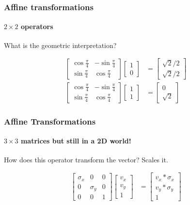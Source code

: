 \documentclass[xcolor=dvipsnames]{beamer}
\begin{document}
\begin{frame}
\frametitle{Affine transformations}
\framesubtitle{$2 \times 2$ operators}

  What is the geometric interpretation?

  \begin{align*}
    \left[ \begin{array}{rr}
      \cos \frac{\pi}{4} & -\sin \frac{\pi}{4} \\
      \sin \frac{\pi}{4} &  \cos \frac{\pi}{4}
      \end{array} \right]
    \left[ \begin{array}{r}
      1 \\
      0
      \end{array} \right]
    & = 
    \left[ \begin{array}{r}
      \sqrt{2}/2 \\
      \sqrt{2}/2
      \end{array} \right] \\
    \left[ \begin{array}{rr}
      \cos \frac{\pi}{4} & -\sin \frac{\pi}{4} \\
      \sin \frac{\pi}{4} &  \cos \frac{\pi}{4}
      \end{array} \right]
    \left[ \begin{array}{r}
      1 \\
      1
      \end{array} \right]
    & = 
    \left[ \begin{array}{r}
      0 \\
      \sqrt{2}  
      \end{array} \right]
    \end{align*}

  \end{frame}

\begin{frame}
\frametitle{Affine Transformations}
\framesubtitle{$3 \times 3$ matrices but still in a 2D world!}

  How does this operator transform the vector? Scales it.

  \begin{align*}
    \left[ \begin{array}{rrr}
      \sigma_x & 0 & 0 \\
      0 & \sigma_y & 0 \\
      0 & 0 & 1
      \end{array} \right]
    \left[ \begin{array}{r}
      v_x \\
      v_y \\
      1
      \end{array} \right]
    & =
    \left[ \begin{array}{r}
      v_x * \sigma_x  \\
      v_y * \sigma_y  \\
      1
      \end{array} \right]
    \end{align*}

  \end{frame}
\end{document}
